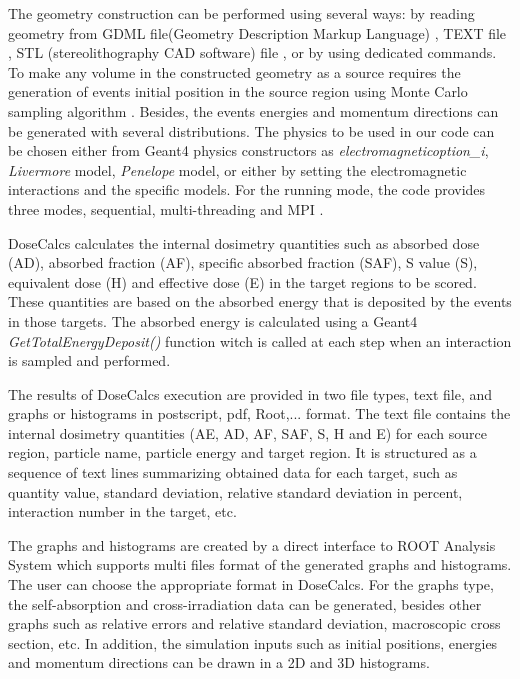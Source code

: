 \documentclass[letterpaper,12pt]{article}
\begin{document}
The geometry construction can be performed using several ways: by reading geometry from GDML file(Geometry Description Markup Language) \cite{GDMLFormat}, TEXT file \cite{TEXTFormat}, STL (stereolithography CAD software) file \cite{STLFormat}, or by using dedicated commands. To make any volume in the constructed geometry as a source requires the generation of events initial position in the source region using Monte Carlo sampling algorithm \cite{ICRPMethod}. Besides, the events energies and momentum directions can be generated with several distributions. The physics to be used in our code can be chosen either from Geant4 physics constructors as \textit{electromagneticoption\_i}, \textit{Livermore} model, \textit{Penelope} model, or either by setting the electromagnetic interactions and the specific models. For the running mode, the code provides three modes, sequential, multi-threading and MPI \cite{MT, MPI}.

DoseCalcs calculates the internal dosimetry quantities such as absorbed dose (AD), absorbed fraction (AF), specific absorbed fraction (SAF), S value (S), equivalent dose (H) and effective dose (E) in the target regions to be scored. These quantities are based on the absorbed energy that is deposited by the events in those targets. The absorbed energy is calculated using a Geant4 \textit{GetTotalEnergyDeposit()} function witch is called at each step when an interaction is sampled and performed.

The results of DoseCalcs execution are provided in two file types, text file, and graphs or histograms in postscript, pdf, Root,... format. The text file contains the internal dosimetry quantities (AE, AD, AF, SAF, S, H and E) for each source region, particle name, particle energy and target region. It is structured as a sequence of text lines summarizing obtained data for each target, such as quantity value, standard deviation, relative standard deviation in percent, interaction number in the target, etc.

The graphs and histograms are created by a direct interface to ROOT Analysis System \cite{ROOT} which supports multi files format of the generated graphs and histograms. The user can choose the appropriate format in DoseCalcs. For the graphs type, the self-absorption and cross-irradiation data can be generated, besides other graphs such as relative errors and relative standard deviation, macroscopic cross section, etc. In addition, the simulation inputs such as initial positions, energies and momentum directions can be drawn in a 2D and 3D histograms.
\end{document}
